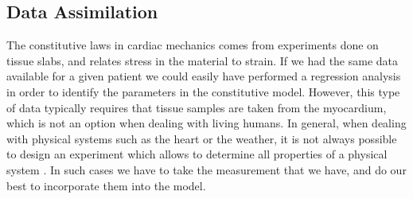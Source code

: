 










\subsection{Data Assimilation}
The constitutive laws in cardiac mechanics comes from experiments
done on tissue slabs, and relates stress in the material to strain.
If we had the same data available for a given patient we could easily
have performed a regression analysis in order to identify the
parameters in the constitutive model. However, this type of data
typically requires that tissue samples are taken from the myocardium,
which is not an option when dealing with living humans. In general,
when dealing with physical systems such as the heart or the weather,
it is not always possible to design an experiment which
allows to determine all properties of a physical system
\cite{chapelle2013fundamental}. In such cases we have to take the
measurement that we have, and do our best to incorporate them into the
model. 

